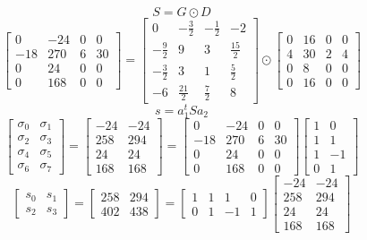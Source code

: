 \documentclass{article}%
\begin{document}
\[%
S = G \odot D%
\]%
\[%
\left[\begin{matrix}0 & -24 & 0 & 0\\-18 & 270 & 6 & 30\\0 & 24 & 0 & 0\\0 & 168 & 0 & 0\end{matrix}\right] = \left[\begin{matrix}0 & - \frac{3}{2} & - \frac{1}{2} & -2\\- \frac{9}{2} & 9 & 3 & \frac{15}{2}\\- \frac{3}{2} & 3 & 1 & \frac{5}{2}\\-6 & \frac{21}{2} & \frac{7}{2} & 8\end{matrix}\right] \odot \left[\begin{matrix}0 & 16 & 0 & 0\\4 & 30 & 2 & 4\\0 & 8 & 0 & 0\\0 & 16 & 0 & 0\end{matrix}\right]%
\]%
\[%
s = a_1^t S a_2%
\]%
\[%
\left[\begin{matrix}\sigma_{0} & \sigma_{1}\\\sigma_{2} & \sigma_{3}\\\sigma_{4} & \sigma_{5}\\\sigma_{6} & \sigma_{7}\end{matrix}\right] = \left[\begin{matrix}-24 & -24\\258 & 294\\24 & 24\\168 & 168\end{matrix}\right] = \left[\begin{matrix}0 & -24 & 0 & 0\\-18 & 270 & 6 & 30\\0 & 24 & 0 & 0\\0 & 168 & 0 & 0\end{matrix}\right] \left[\begin{matrix}1 & 0\\1 & 1\\1 & -1\\0 & 1\end{matrix}\right]%
\]%
\[%
\left[\begin{matrix}s_{0} & s_{1}\\s_{2} & s_{3}\end{matrix}\right] = \left[\begin{matrix}258 & 294\\402 & 438\end{matrix}\right] = \left[\begin{matrix}1 & 1 & 1 & 0\\0 & 1 & -1 & 1\end{matrix}\right] \left[\begin{matrix}-24 & -24\\258 & 294\\24 & 24\\168 & 168\end{matrix}\right]%
\]%
\end{document}
